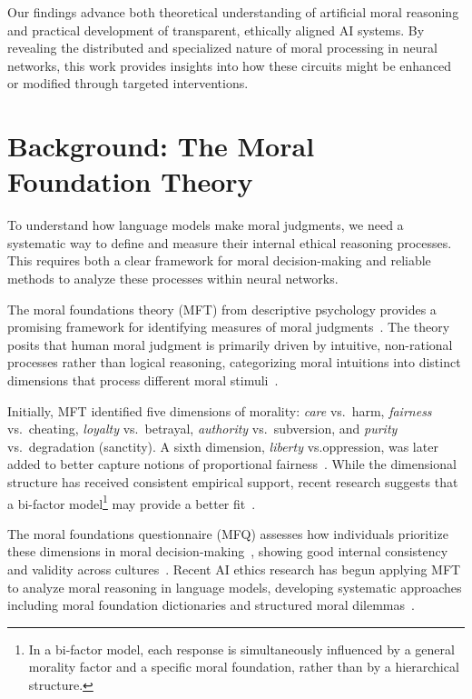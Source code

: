 \documentclass[runninghheads]{llncs}
\begin{document}
Our findings advance both theoretical understanding of artificial moral reasoning and practical development of transparent, ethically aligned AI systems. By revealing the distributed and specialized nature of moral processing in neural networks, this work provides insights into how these circuits might be enhanced or modified through targeted interventions.



\section{Background: The Moral Foundation Theory}
\label{MFT}
To understand how language models make moral judgments, we need a systematic way to define and measure their internal ethical reasoning processes. This requires both a clear framework for moral decision-making and reliable methods to analyze these processes within neural networks.

The moral foundations theory (MFT) from descriptive psychology provides a promising framework for identifying measures of moral judgments~\cite{Haidt2004}. The theory posits that human moral judgment is primarily driven by intuitive, non-rational processes rather than logical reasoning, categorizing moral intuitions into distinct dimensions that process different moral stimuli~\cite{Simpson2020}.

Initially, MFT identified five dimensions of morality: \emph{care} vs.~harm, \emph{fairness} vs.~cheating, \emph{loyalty} vs.~betrayal, \emph{authority} vs.~subversion, and \emph{purity} vs.~degradation (sanctity)\cite{Graham2011Mapping}. A sixth dimension, \emph{liberty} vs.oppression, was later added to better capture notions of proportional fairness~\cite{Haidt2012}. 
While the dimensional structure has received consistent empirical support, recent research suggests that a bi-factor model\footnote{In a bi-factor model, each response is simultaneously influenced by a general morality factor and a specific moral foundation, rather than by a hierarchical structure.} may provide a better fit~\cite{Wormley2023Measuring}.

The moral foundations questionnaire (MFQ) assesses how individuals prioritize these dimensions in moral decision-making~\cite{Zhang2020}, showing good internal consistency and validity across cultures~\cite{Metayer2014,Davies2014Confirmatory}. Recent AI ethics research has begun applying MFT to analyze moral reasoning in language models, developing systematic approaches including moral foundation dictionaries and structured moral dilemmas~\cite{Hopp2021,Hendrycks2023,Brailsford2024,Nunes2024,Zangari2024}.
\end{document}
